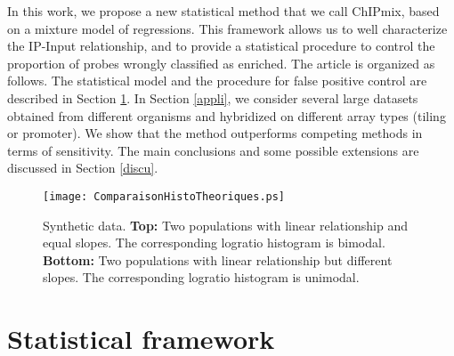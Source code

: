 \documentclass{llncs}
\begin{document}

In this work, we propose a new statistical method that we call
ChIPmix, based on a mixture model of regressions. This framework
allows us to well characterize the IP-Input relationship, and to
provide a statistical procedure to control the proportion of probes
wrongly classified as enriched. The article is organized as follows.
The statistical model and the procedure for false positive control
are described in Section \ref{methodo}.  In Section \ref{appli}, we
consider several large datasets obtained from different organisms
and hybridized on different array types (tiling or promoter). We
show that the method outperforms competing methods in terms of
sensitivity. The main conclusions and some possible extensions are
discussed in Section \ref{discu}.
\begin{figure}
\begin{center}
\texttt{[image: ComparaisonHistoTheoriques.ps]}
\end{center}
\caption{Synthetic data. \textbf{Top:} Two populations with linear
relationship and equal slopes. The corresponding logratio histogram
is bimodal. \textbf{Bottom:} Two populations with linear
relationship but different slopes. The corresponding logratio
histogram is unimodal. \label{ComparaisonHistoTheoriques}}
\end{figure}
\section{Statistical framework}\label{methodo}
\end{document}
